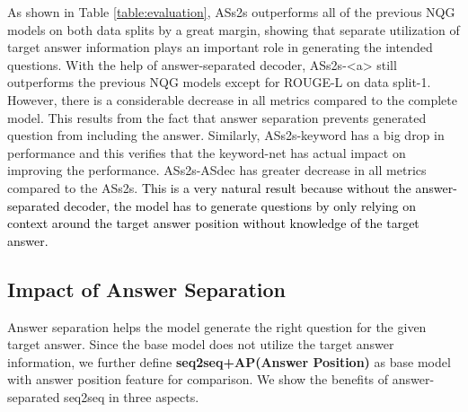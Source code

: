 \documentclass[letterpaper]{article} %
\newcommand{\hh}[1]{\textcolor{black}{#1}}
\begin{document}
As shown in Table \ref{table:evaluation}, ASs2s outperforms all of the previous NQG models on both data splits by a great margin, showing that separate utilization of target answer information plays an important role in generating the intended questions. With the help of answer-separated decoder, ASs2s-\textless a\textgreater{} still outperforms the previous NQG models except for ROUGE-L on data split-1. However, there is a considerable decrease in all metrics compared to the complete model. This results from the fact that answer separation prevents generated question from including the answer. Similarly, ASs2s-keyword has a big drop in performance and this verifies that the keyword-net has actual impact on improving the performance. ASs2s-ASdec has greater decrease in all metrics compared to the ASs2s. \hh{This is a very natural result because without the answer-separated decoder, the model has to generate questions by only relying on context around the target answer position without knowledge of the target answer.}
% 
% 
% 
% 
% 
% 
% 
% 
%    
% 
% 
% 


\subsection{Impact of Answer Separation}
Answer separation helps the model generate  the right question for the given target answer. Since the base model does not utilize the target answer information, we further define \textbf{seq2seq+AP(Answer Position)} as base model with answer position feature \cite{zhou2017neural} for comparison. We show the benefits of answer-separated seq2seq in three aspects.
\end{document}
